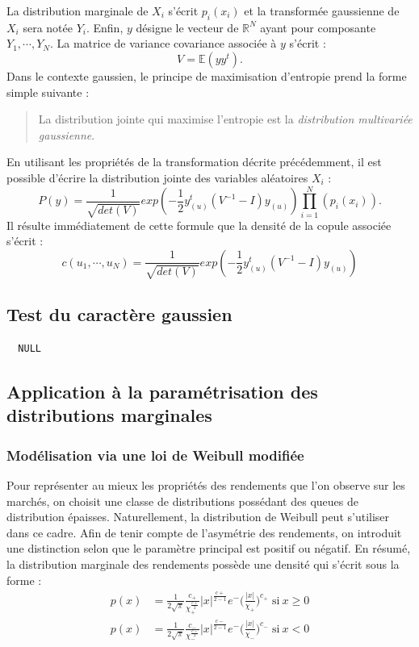 \documentclass{article}
\begin{document}
  La distribution marginale de $X_{i}$ s'écrit $p_{i}(x_{i})$ et la transformée gaussienne de $X_{i}$ sera notée $Y_{i}$. Enfin, $y$ désigne le vecteur de $\mathbb{R}^{N}$ ayant pour composante $Y_{1},\cdots ,Y_{N}$.
   La matrice de variance covariance associée à $y$ s'écrit :
  \begin{equation}
  V=\mathbb{E}(yy^{t}).
  \end{equation}
   Dans le contexte gaussien, le principe de maximisation d'entropie prend la forme simple suivante :
   \begin{quote}
   La distribution jointe qui maximise l'entropie est la \emph{distribution multivariée gaussienne}. 
   \end{quote}
 En utilisant les propriétés de la transformation décrite précédemment, il est possible d'écrire la distribution jointe des variables aléatoires $X_{i}$ :
   \begin{equation}
   P(y)=\frac{1}{\sqrt{det(V)}}exp(-\frac{1}{2}y^{t}_{(u)}(V^{-1}-I)y_{(u)})\prod_{i=1}^{N}(p_{i}(x_{i})).
   \end{equation}
   Il résulte immédiatement de cette formule que la densité de la copule associée s'écrit :
   \begin{equation}
   c(u_{1},\cdots ,u_{N})=\frac{1}{\sqrt{det(V)}}exp(-\frac{1}{2}y^{t}_{(u)}(V^{-1}-I)y_{(u)})
   \end{equation}
   
  \subsection{Test du caractère gaussien} 
  
  \begin{verbatim}
  NULL
  \end{verbatim}
  
  \subsection{Application à la paramétrisation des distributions marginales}
  
  \subsubsection{Modélisation via une loi de Weibull modifiée}
  
   Pour représenter au mieux les propriétés des rendements que l'on observe sur les marchés, on choisit une classe de distributions possédant des queues de distribution épaisses. Naturellement, la distribution de Weibull peut s'utiliser dans ce cadre. Afin de tenir compte de l'asymétrie des rendements, on introduit une distinction selon que le paramètre principal est positif ou négatif. En résumé, la distribution marginale des rendements possède une densité qui s'écrit sous la forme :
   \begin{align}
   p(x) &= \frac{1}{2\sqrt{\pi}}\frac{c_{+}}{\chi _{+}^{\frac{c+}{2}}}\vert x\vert^{\frac{c+}{2-1}}e^-({\frac{\vert x\vert}{\chi _{+}})^{c_{+}}}\;\text{si}\: x\geqslant 0\\
  p(x) &= \frac{1}{2\sqrt{\pi}}\frac{c_{-}}{\chi _{-}^{\frac{c-}{2}}}\vert x\vert^{\frac{c-}{2-1}}e^-({\frac{\vert x\vert}{\chi _{-}})^{c_{-}}}\;\text{si}\: x<0
  \end{align}
\end{document}

